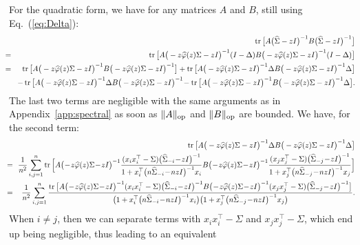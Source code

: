 \documentclass[11pt]{article}
\newcommand{\BEAS}{\begin{eqnarray*}}
\newcommand{\EEAS}{\end{eqnarray*}}
\newcommand{\tr}{\mathop{ \rm tr}}
\newcommand{\idm}{I}
\newcommand{\eq}[1]{Eq.~(\ref{eq:#1})}
\def \hphi{ \widehat{\varphi} }
\def \hS{ \widehat{ \Sigma} }
\def \S{  { \Sigma} }
\begin{document}
  For the quadratic form, we have for any matrices $A$ and $B$, still using \eq{Delta}:
  \BEAS
  & & \tr \big[ A  \big( \hS -  z\idm \big)^{-1}  B  \big( \hS -  z\idm \big)^{-1}  \big] 
  \\
  &\!\! \!\!\!= \!& 
  \tr \big[ A   \big( - z \hphi(z) \S - z \idm \big)^{-1}  ( \idm - \Delta)  B \big( - z \hphi(z) \S - z \idm \big)^{-1}    
   ( \idm - \Delta)  \big] 
\\
 &\!\! \!\!\!= \!& 
  \tr \big[ A   \big( - z \hphi(z) \S - z \idm \big)^{-1}    B   \big( - z \hphi(z) \S - z \idm \big)^{-1}    \big] 
  + \tr \big[ A   \big( - z \hphi(z) \S - z \idm \big)^{-1}  \Delta   B     \big( - z \hphi(z) \S - z \idm \big)^{-1}   \Delta \big] \\
  & & -   \tr \big[ A   \big( - z \hphi(z) \S - z \idm \big)^{-1} \Delta  B \big( - z \hphi(z) \S - z \idm \big)^{-1} 
\! -    \tr \big[ A   \big( - z \hphi(z) \S - z \idm \big)^{-1}   B \big( - z \hphi(z) \S - z \idm \big)^{-1}   \Delta  
\big] .
  \EEAS
  The last two terms are negligible with the same arguments as in Appendix~\ref{app:spectral} as soon as $\|A\|_{\rm op}$ and $\| B\|_{\rm op}$ are bounded. 
  We have, for the second term:
  \BEAS
  & & \tr \big[ A   \big( - z \hphi(z) \S - z \idm \big)^{-1}  \Delta   B       \big( - z \hphi(z) \S - z \idm \big)^{-1}\Delta    \big] \\
  & \!\!\!\!= \!\!& 
  \frac{1}{n^2}   \sum_{i,j=1}^n
  \tr \Big[  A   \big( \!-\! z \hphi(z) \S \!-\! z \idm \big)^{-1} 
    \frac{  ( x_i x_i^\top - \S)   \big(       \hS_{-i}  \! -\!   z    \idm \big)^{-1}
  }{1+ x_i^\top   \big(    n  \hS_{-i}  \!- \!  nz    \idm \big)^{-1} x_i}
   B       \big(\! -\! z \hphi(z) \S\! -\! z \idm \big)^{-1}
    \frac{  ( x_j x_j^\top - \S)   \big(       \hS_{-j}  \! - \!  z    \idm \big)^{-1}
  }{1+ x_j^\top   \big(    n  \hS_{-j}\!  - \!  nz    \idm \big)^{-1} x_j}\Big]
  \\
   & \!\!\!\!= \!\!& 
    \frac{1}{n^2}   \sum_{i,j=1}^n \frac{\tr \big[
    A   \big( \!-\! z \hphi(z) \S \!-\! z \idm \big)^{-1} 
    ( x_i x_i^\top - \S)   \big(       \hS_{-i}  \! - \!  z    \idm \big)^{-1}
     B       \big( \!-\! z \hphi(z) \S \!-\! z \idm \big)^{-1}
     ( x_j x_j^\top - \S)   \big(       \hS_{-j}  \! -\!   z    \idm \big)^{-1}
\big]
   }{\big(
1+ x_i^\top   \big(    n  \hS_{-i}  \!-\!   nz    \idm \big)^{-1} x_i
    \big)\big(1+ x_j^\top   \big(    n  \hS_{-j}  \!-\!   nz    \idm \big)^{-1} x_j\big)
    } .
    \EEAS
    When $i \neq j$, then we can separate terms with $x_i x_i^\top - \S$ and $x_j x_j^\top - \S$, which end up being negligible, thus leading to an equivalent
\end{document}
